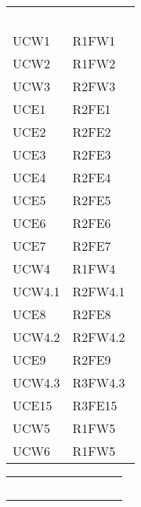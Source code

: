 \begin{table}[!htbp]
\renewcommand{\arraystretch}{1.5}
\begin{tabular}{ m{}<{\centering}  m{}<{\centering} }
	\rowcolor{darkblue}
	\textcolor{white}{\textbf{Fonte}} &\textcolor{white}{\textbf{Requisiti}}\\ 

	UCW1 & R1FW1\\	
	 
	UCW2 & R1FW2\\	

	UCW3 & R2FW3\\	
	 
	UCE1 & R2FE1\\	
	 
	UCE2 & R2FE2\\	
	 
	UCE3 & R2FE3\\	

	UCE4 & R2FE4\\	
	
	UCE5 & R2FE5\\
	 
	UCE6 & R2FE6\\	 
	 
	UCE7 & R2FE7\\	

	UCW4 & R1FW4\\ 
	 
	UCW4.1 & R2FW4.1\\	
	 
	UCE8 & R2FE8 \\	
	 
	UCW4.2 & R2FW4.2\\		 

	UCE9 & R2FE9\\		
	 
	UCW4.3 & R3FW4.3 \\				
	 
	UCE15 & R3FE15\\			
	  	 	 	
	UCW5 & R1FW5\\		
	 
	UCW6 & R1FW5 \\

\end{tabular}
\begin{tabular}{ m{}<{\centering}  m{}<{\centering} }
	\rowcolor{darkblue}
	\textcolor{white}{\textbf{Fonte}} &\textcolor{white}{\textbf{Requisiti}}\\ 


\end{tabular}
\end{table}
